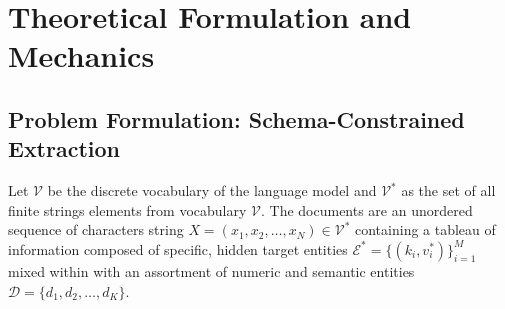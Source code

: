 \documentclass[conference]{IEEEtran}
\begin{document}
\section{Theoretical Formulation and Mechanics}
\label{sec:theory}

\subsection{Problem Formulation: Schema-Constrained Extraction}
Let $\mathcal{V}$ be the discrete vocabulary of the language model and $\mathcal{V}^*$ as the set of all finite strings elements from vocabulary $\mathcal{V}$. The documents are an unordered sequence of characters string $X = (x_1, x_2, \dots, x_N) \in \mathcal{V}^*$ containing a tableau of information composed of specific, hidden target entities $\mathcal{E}^* = \{(k_i, v_i^*)\}_{i=1}^M$ mixed within with an assortment of numeric and semantic entities $\mathcal{D} = \{d_1, d_2, \dots, d_K\}$.
\end{document}
